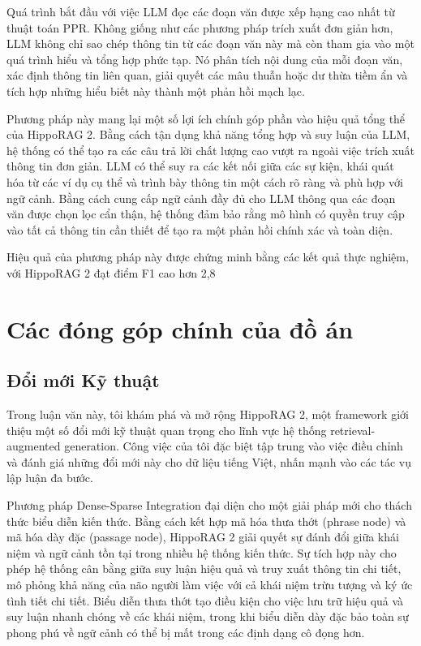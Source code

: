 \documentclass[../main.tex]{subfiles}
\begin{document}
Quá trình bắt đầu với việc LLM đọc các đoạn văn được xếp hạng cao nhất từ thuật toán PPR. Không giống như các phương pháp trích xuất đơn giản hơn, LLM không chỉ sao chép thông tin từ các đoạn văn này mà còn tham gia vào một quá trình hiểu và tổng hợp phức tạp. Nó phân tích nội dung của mỗi đoạn văn, xác định thông tin liên quan, giải quyết các mâu thuẫn hoặc dư thừa tiềm ẩn và tích hợp những hiểu biết này thành một phản hồi mạch lạc.

Phương pháp này mang lại một số lợi ích chính góp phần vào hiệu quả tổng thể của HippoRAG 2. Bằng cách tận dụng khả năng tổng hợp và suy luận của LLM, hệ thống có thể tạo ra các câu trả lời chất lượng cao vượt ra ngoài việc trích xuất thông tin đơn giản. LLM có thể suy ra các kết nối giữa các sự kiện, khái quát hóa từ các ví dụ cụ thể và trình bày thông tin một cách rõ ràng và phù hợp với ngữ cảnh. Bằng cách cung cấp ngữ cảnh đầy đủ cho LLM thông qua các đoạn văn được chọn lọc cẩn thận, hệ thống đảm bảo rằng mô hình có quyền truy cập vào tất cả thông tin cần thiết để tạo ra một phản hồi chính xác và toàn diện.

Hiệu quả của phương pháp này được chứng minh bằng các kết quả thực nghiệm, với HippoRAG 2 đạt điểm F1 cao hơn 2,8%

\section{Các đóng góp chính của đồ án}
\subsection{Đổi mới Kỹ thuật}
Trong luận văn này, tôi khám phá và mở rộng HippoRAG 2, một framework giới thiệu một số đổi mới kỹ thuật quan trọng cho lĩnh vực hệ thống retrieval-augmented generation. Công việc của tôi đặc biệt tập trung vào việc điều chỉnh và đánh giá những đổi mới này cho dữ liệu tiếng Việt, nhấn mạnh vào các tác vụ lập luận đa bước.

Phương pháp Dense-Sparse Integration đại diện cho một giải pháp mới cho thách thức biểu diễn kiến thức. Bằng cách kết hợp mã hóa thưa thớt (phrase node) và mã hóa dày đặc (passage node), HippoRAG 2 giải quyết sự đánh đổi giữa khái niệm và ngữ cảnh tồn tại trong nhiều hệ thống kiến thức. Sự tích hợp này cho phép hệ thống cân bằng giữa suy luận hiệu quả và truy xuất thông tin chi tiết, mô phỏng khả năng của não người làm việc với cả khái niệm trừu tượng và ký ức tình tiết chi tiết. Biểu diễn thưa thớt tạo điều kiện cho việc lưu trữ hiệu quả và suy luận nhanh chóng về các khái niệm, trong khi biểu diễn dày đặc bảo toàn sự phong phú về ngữ cảnh có thể bị mất trong các định dạng cô đọng hơn.
\end{document}
